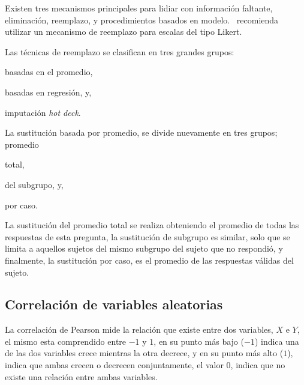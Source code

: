 Existen tres mecanismos\cite{tsikriktsis2005review}
principales para lidiar con información faltante, eliminación, reemplazo, y
procedimientos basados en modelo.~\cite{tsikriktsis2005review} recomienda
utilizar un mecanismo de reemplazo para escalas del tipo Likert.

Las técnicas de reemplazo se clasifican en tres grandes
grupos\cite{tsikriktsis2005review}:
\begin{enumerate*}[label=\itshape\alph*\upshape.]
\item basadas en el promedio,
\item basadas en regresión, y,
\item imputación \emph{hot deck}.
\end{enumerate*}

La sustitución basada por promedio, se divide nuevamente en tres
grupos\cite{tsikriktsis2005review}; promedio
\begin{enumerate*}[label=\itshape\alph*\upshape.]
\item total,
\item del subgrupo, y,
\item por caso.
\end{enumerate*}

La sustitución del promedio total se realiza obteniendo el promedio de todas las
respuestas de esta pregunta, la sustitución de subgrupo es similar, solo que se
limita a aquellos sujetos del mismo subgrupo del sujeto que no respondió, y
finalmente, la sustitución por caso, es el promedio de las respuestas válidas
del sujeto.

\subsection{Correlación de variables aleatorias}
\label{sec:correlacion}


La correlación de Pearson\cite{BoslaughStatistics2008} mide la relación que
existe entre dos variables, $X$ e $Y$, el mismo esta comprendido entre $-1$ y
$1$, en su punto más bajo ($-1$) indica una de las dos variables crece mientras
la otra decrece, y en su punto más alto ($1$), indica que ambas crecen o
decrecen conjuntamente, el valor $0$, indica que no existe una relación entre
ambas variables.


